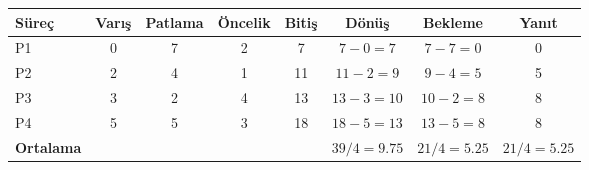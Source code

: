 \begin{tabular}{@{}lccccccc@{}}
\toprule
\textbf{Süreç} & \textbf{Varış} & \textbf{Patlama} & \textbf{Öncelik} & \textbf{Bitiş} & \textbf{Dönüş} & \textbf{Bekleme} & \textbf{Yanıt}\\
\midrule
P1 & 0 & 7 & 2 & 7 & $7-0=7$ & $7-7=0$ & 0\\
P2 & 2 & 4 & 1 & 11 & $11-2=9$ & $9-4=5$ & 5\\
P3 & 3 & 2 & 4 & 13 & $13-3=10$ & $10-2=8$ & 8\\
P4 & 5 & 5 & 3 & 18 & $18-5=13$ & $13-5=8$ & 8\\
\midrule
\textbf{Ortalama} &  &  &  &  & $39/4=9.75$ & $21/4=5.25$ & $21/4=5.25$\\
\bottomrule
\end{tabular}
